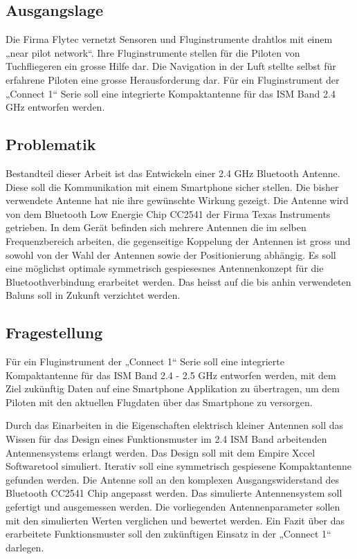 \subsection{Ausgangslage}
Die Firma Flytec vernetzt Sensoren und Fluginstrumente drahtlos mit einem  „near pilot network“. Ihre Fluginstrumente stellen für die Piloten von Tuchfliegeren ein grosse Hilfe dar. Die Navigation in der Luft stellte selbst für erfahrene Piloten eine grosse Herausforderung dar. Für ein Fluginstrument der „Connect 1“ Serie  soll eine integrierte Kompaktantenne für das ISM Band 2.4 GHz entworfen werden. 

\subsection{Problematik}
Bestandteil dieser Arbeit ist das Entwickeln einer 2.4 GHz Bluetooth Antenne. Diese soll die Kommunikation mit einem Smartphone sicher stellen. Die bisher verwendete Antenne hat nie ihre gewünschte Wirkung gezeigt. Die Antenne wird von dem Bluetooth Low Energie Chip CC2541 der Firma Texas Instruments getrieben. In dem Gerät befinden sich mehrere Antennen die im selben Frequenzbereich arbeiten, die gegenseitige Koppelung der Antennen ist gross und sowohl  von der Wahl der Antennen sowie der Positionierung abhängig. Es soll eine möglichst optimale symmetrisch gespiesesnes Antennenkonzept für die Bluetoothverbindung erarbeitet werden. Das heisst auf die bis anhin verwendeten Baluns soll in Zukunft verzichtet werden.
\subsection{Fragestellung}
Für ein Fluginstrument der „Connect 1“ Serie  soll eine integrierte Kompaktantenne für das ISM Band 2.4 - 2.5 GHz entworfen werden, mit dem Ziel zukünftig Daten auf eine Smartphone Applikation zu übertragen, um dem Piloten mit den aktuellen Flugdaten über das Smartphone zu versorgen. 

Durch das Einarbeiten in die Eigenschaften elektrisch kleiner Antennen soll das Wissen für das Design eines Funktionsmuster  im 2.4 ISM Band arbeitenden Antennensystems erlangt werden. Das Design soll mit dem Empire Xccel Softwaretool simuliert. Iterativ soll eine symmetrisch gespiesene Kompaktantenne gefunden werden. Die Antenne soll an den komplexen Ausgangswiderstand des Bluetooth CC2541 Chip angepasst werden. Das simulierte Antennensystem soll gefertigt und ausgemessen werden. Die vorliegenden Antennenparameter sollen mit den simulierten Werten verglichen und bewertet werden. Ein Fazit über das erarbeitete Funktionsmuster soll den zukünftigen Einsatz in der „Connect 1“ darlegen.

